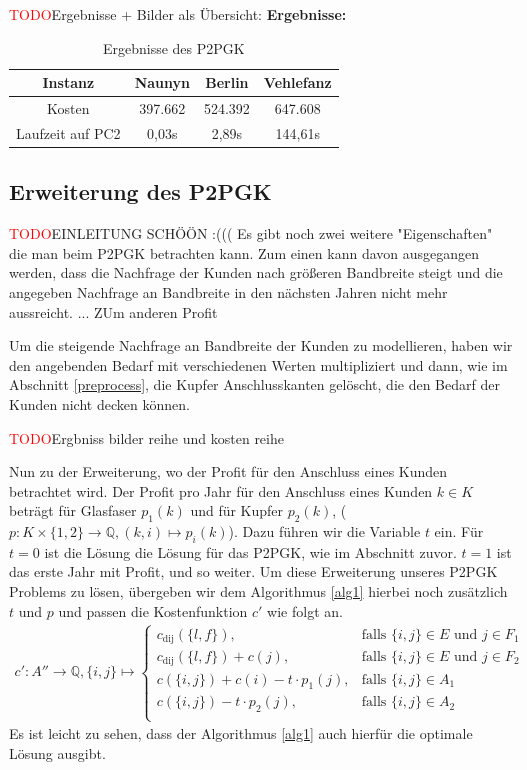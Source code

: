 \documentclass[11pt,a4paper]{article}
\newcommand{\Q}{\mathbb{Q}}
\newcommand{\TODO}{\textcolor{red}{TODO}}
\theoremstyle{my_th_style1}
\begin{document}
\TODO Ergebnisse + Bilder als Übersicht:
\textbf{Ergebnisse:} 
\begin{table}[h]
	\centering
	\begin{tabular}{c|c|c|c}
		Instanz & Naunyn & Berlin & Vehlefanz \\	
		\hline
		Kosten & 397.662 & 524.392 & 647.608 \\
		Laufzeit auf PC2 & 0,03s & 2,89s & 144,61s \\
	\end{tabular}
	\label{P2PGK}
	\caption{Ergebnisse des P2PGK} 
\end{table}

\subsection{Erweiterung des P2PGK}
\TODO EINLEITUNG SCHÖÖN :(((
Es gibt noch zwei weitere "Eigenschaften" die man beim P2PGK betrachten kann. Zum einen kann davon ausgegangen werden, dass die Nachfrage der Kunden nach größeren Bandbreite steigt und die angegeben Nachfrage an Bandbreite in den nächsten Jahren nicht mehr aussreicht. ... ZUm anderen Profit

Um die steigende Nachfrage an Bandbreite der Kunden zu modellieren, haben wir den angebenden Bedarf mit verschiedenen Werten multipliziert und dann, wie im Abschnitt \ref{preprocess}, die Kupfer Anschlusskanten gelöscht, die den Bedarf der Kunden nicht decken können.

\TODO Ergbniss bilder reihe und kosten reihe

Nun zu der Erweiterung, wo der Profit für den Anschluss eines Kunden  betrachtet wird.
Der Profit pro Jahr für den Anschluss eines Kunden $k \in K$ beträgt für Glasfaser $p_1(k)$ und für Kupfer $p_2(k)$, ($p:K \times \{1,2\} \rightarrow \Q,(k,i) \mapsto p_i(k)$). Dazu führen wir die Variable $t$ ein. Für $t=0$ ist die Lösung die Lösung für das P2PGK, wie im Abschnitt zuvor. $t=1$ ist das erste Jahr mit Profit, und so weiter. Um diese Erweiterung unseres P2PGK Problems zu lösen, übergeben wir dem Algorithmus  \ref{alg1} hierbei noch zusätzlich $t$ und $p$ und passen die Kostenfunktion $c'$ wie folgt an.
\begin{align*}
c': A'' \rightarrow \Q, \{ i,j \} \mapsto \left\{\begin{array}{cl} 
c_{\text{dij}}(\{l,f\}), & \text{falls } \{i,j\} \in E \text{ und } j \in F_1\\ 
c_{\text{dij}}(\{l,f\})+c(j), & \text{falls } \{i,j\} \in E \text{ und } j \in F_2\\ 
c(\{i,j\}) + c(i) - t \cdot p_1(j), & \text{falls } \{i,j\} \in A_1\\ 
c(\{i,j\}) - t \cdot p_2(j), & \text{falls } \{i,j\} \in A_2\\ 
\end{array}
\right.
\end{align*}
Es ist leicht zu sehen, dass der Algorithmus \ref{alg1} auch hierfür die optimale Lösung ausgibt. 
\end{document}
